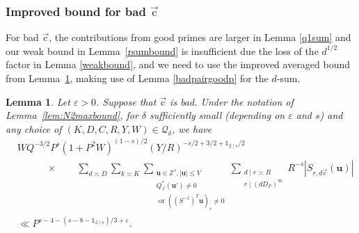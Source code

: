 \documentclass[letterpaper,11pt]{amsart}
\numberwithin{equation}{section}
\newtheorem{lemma}[theorem]{Lemma}
\theoremstyle{definition}
\numberwithin{equation}{section}
\newcommand{\ZZ}{\mathbb{Z}}
\newcommand{\uu}{\mathbf{u}}
\newcommand{\uc}{{\vec{\mathrm{c}}}}
\newcommand{\ve}{\varepsilon}
\begin{document}
\subsubsection{Improved bound for bad $\uc$}

For bad $\uc$, the contributions from good primes are larger in Lemma \ref{q1sum} and our weak bound in Lemma~\ref{rsumbound} is insufficient due the loss of the $d^{1/2}$ factor in Lemma \ref{weakbound},  and we need to use the improved averaged bound from Lemma~\ref{lem:splitting-d}, making use of Lemma \ref{badpairgoodp} for the $d$-sum.

\begin{lemma}
    \label{lem:splitting-d}
Let $\ve>0$. 
    Suppose that $\uc$ is bad. Under the notation of Lemma~\ref{lem:N2maxbound}, for $\delta$ sufficiently small (depending on $\ve$ and $s$) and any choice of $(K, D,C,R, Y, W)\in \mathcal Q_\delta$, we have  
\begin{equation}
\begin{split}
&WQ^{-3/2} P^{s} (1+P^2W)^{(1-s)/2}(Y/R)^{-s/2+3/2+\mathds 1_{2\mid s}/2}\\
&\quad\qquad\times \quad \quad \sum_{d\asymp D}\sum_{k\asymp K}\sum_{\substack{\uu\in\ZZ^s,  |\uu|\leq V\\ Q_\uc^*(\uu')\not=0 \\\text{ or } ((S^{-1})^T\uu)_s\not=0 }}\sum_{\substack{d\mid r\asymp R\\ r\mid (dD_F)^\infty}}R^{-s}|S_{r, d\uc}(\uu)|
\\&
 \ll
 P^{s-4-(s-8-\mathds 1_{2\mid s})/3+\ve}
 .\label{E21}
 \end{split}
\end{equation}
\end{lemma}
\end{document}
